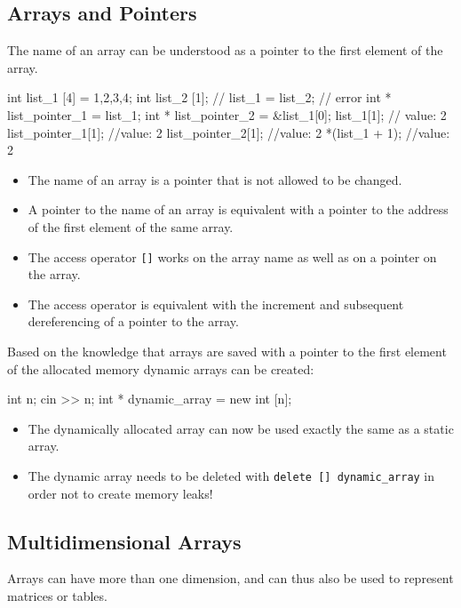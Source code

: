 \documentclass[10pt,a4paper]{scrartcl}
\begin{document}
\begin{multicols*}{2}
\subsection{Arrays and Pointers}
\label{sec:ArraysAndPointers}

The name of an array can be understood as a pointer to the first element of the array.

\begin{TPCpp}
int list_1 [4] = {1,2,3,4};
int list_2 [1];
// list_1 = list_2; // error
int * list_pointer_1 = list_1;
int * list_pointer_2 = &list_1[0];
list_1[1]; // value: 2
list_pointer_1[1]; //value: 2
list_pointer_2[1]; //value: 2
*(list_1 + 1); //value: 2
\end{TPCpp}

\begin{itemize}
\item The name of an array is a pointer that is not allowed to be changed.
\item A pointer to the name of an array is equivalent with a pointer to the address of the first element of the same array.
\item The access operator \verb+[]+ works on the array name as well as on a pointer on the array.
\item The access operator is equivalent with the increment and subsequent dereferencing of a pointer to the array.
\end{itemize}

Based on the knowledge that arrays are saved with a pointer to the first element of the allocated memory dynamic arrays can be created:

\begin{TPCpp}
int n;
cin >> n;
int * dynamic_array = new int [n];
\end{TPCpp}

\begin{itemize}
\item The dynamically allocated array can now be used exactly the same as a static array.
\item The dynamic array needs to be deleted with \verb+delete [] dynamic_array+ in order not to create memory leaks!
\end{itemize}

\subsection{Multidimensional Arrays}

Arrays can have more than one dimension, and can thus also be used to represent matrices or tables. 


\end{multicols*}
\end{document}
